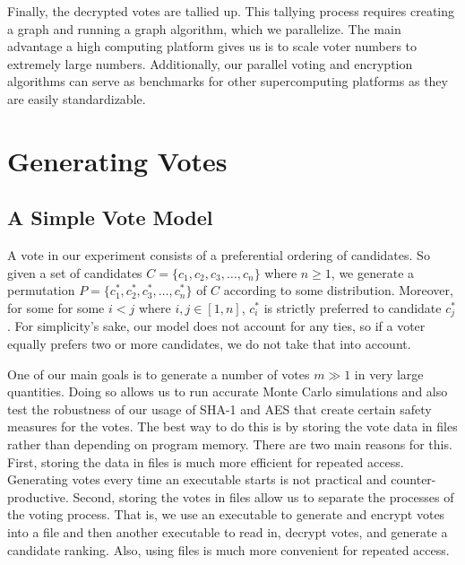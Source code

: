 \documentclass[final,5p,times,twocolumn,authoryear, 10pt]{elsarticle}
\begin{document}
Finally, the decrypted votes are tallied up. This tallying process requires
creating a graph and running a graph algorithm, which we parallelize. The main
advantage a high computing platform gives us is to scale voter numbers to
extremely large numbers. Additionally, our parallel voting and encryption
algorithms can serve as benchmarks for other supercomputing platforms as they
are easily standardizable.

\section{Generating Votes}
\label{Generating Votes}

\subsection{A Simple Vote Model}
\label{A Simple Vote Model}
A vote in our experiment consists of a preferential ordering of candidates. So
given a set of candidates $C = \{c_1, c_2, c_3, \ldots, c_n\}$ where $n \geq
1$, we generate a permutation $P = \{c^*_1, c^*_2, c^*_3, \ldots, c^*_n\}$ of
$C$ according to some distribution. Moreover, for some for some $i < j$ where
$i, j \in [1, n]$, $c^*_i$ is strictly preferred to candidate $c^*_j$. For
simplicity's sake, our model does not account for any ties, so if a voter
equally prefers two or more candidates, we do not take that into account.

One of our main goals is to generate a number of votes $m \gg 1$ in very large
quantities. Doing so allows us to run accurate Monte Carlo simulations and also
test the robustness of our usage of SHA-1 and AES that create certain safety
measures for the votes. The best way to do this is by storing the vote data in
files rather than depending on program memory. There are two main reasons for
this. First, storing the data in files is much more efficient for repeated
access. Generating votes every time an executable starts is not practical and
counter-productive. Second, storing the votes in files allow us to separate the
processes of the voting process. That is, we use an executable to generate and
encrypt votes into a file and then another executable to read in, decrypt
votes, and generate a candidate ranking. Also, using files is much more
convenient for repeated access. 
\end{document}
